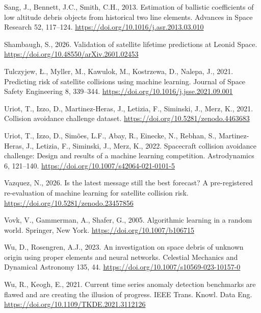\documentclass[
]{article}
\newlength{\cslhangindent}
\newenvironment{CSLReferences}[2] %
 {\begin{list}{}{%
  \setlength{\itemindent}{0pt}
  \setlength{\leftmargin}{0pt}
  \setlength{\parsep}{0pt}
  \ifodd #1
   \setlength{\leftmargin}{\cslhangindent}
   \setlength{\itemindent}{-1\cslhangindent}
  \fi
  \setlength{\itemsep}{#2\baselineskip}}}
 {\end{list}}
\begin{document}
\begin{CSLReferences}{1}{0}
Sang, J., Bennett, J.C., Smith, C.H., 2013. Estimation of ballistic
coefficients of low altitude debris objects from historical two line
elements. Advances in Space Research 52, 117--124.
\url{https://doi.org/10.1016/j.asr.2013.03.010}

Shambaugh, S., 2026. Validation of satellite lifetime predictions at
{Leonid} {Space}. \url{https://doi.org/10.48550/arXiv.2601.02453}

Tulczyjew, Ł., Myller, M., Kawulok, M., Kostrzewa, D., Nalepa, J., 2021.
Predicting risk of satellite collisions using machine learning. Journal
of Space Safety Engineering 8, 339--344.
\url{https://doi.org/10.1016/j.jsse.2021.09.001}

Uriot, T., Izzo, D., Martinez-Heras, J., Letizia, F., Siminski, J.,
Merz, K., 2021. Collision avoidance challenge dataset.
\url{https://doi.org/10.5281/zenodo.4463683}

Uriot, T., Izzo, D., Simões, L.F., Abay, R., Einecke, N., Rebhan, S.,
Martinez-Heras, J., Letizia, F., Siminski, J., Merz, K., 2022.
Spacecraft collision avoidance challenge: Design and results of a
machine learning competition. Astrodynamics 6, 121--140.
\url{https://doi.org/10.1007/s42064-021-0101-5}

Vazquez, N., 2026. Is the latest message still the best forecast? {A}
pre-registered re-evaluation of machine learning for satellite collision
risk. \url{https://doi.org/10.5281/zenodo.23457856}

Vovk, V., Gammerman, A., Shafer, G., 2005. Algorithmic learning in a
random world. Springer, New York. \url{https://doi.org/10.1007/b106715}

Wu, D., Rosengren, A.J., 2023. An investigation on space debris of
unknown origin using proper elements and neural networks. Celestial
Mechanics and Dynamical Astronomy 135, 44.
\url{https://doi.org/10.1007/s10569-023-10157-0}

Wu, R., Keogh, E., 2021. Current time series anomaly detection
benchmarks are flawed and are creating the illusion of progress. IEEE
Trans. Knowl. Data Eng. \url{https://doi.org/10.1109/TKDE.2021.3112126}


\end{CSLReferences}
\end{document}
